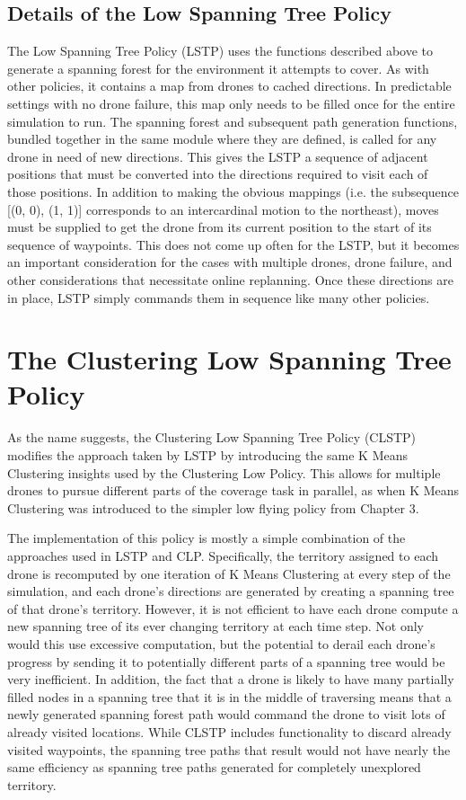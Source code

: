 \subsection{Details of the Low Spanning Tree Policy}

The Low Spanning Tree Policy (LSTP) uses the functions described above to generate a spanning forest for the environment it attempts to cover. As with other policies, it contains a map from drones to cached directions. In predictable settings with no drone failure, this map only needs to be filled once for the entire simulation to run. The spanning forest and subsequent path generation functions, bundled together in the same module where they are defined, is called for any drone in need of new directions. This gives the LSTP a sequence of adjacent positions that must be converted into the directions required to visit each of those positions. In addition to making the obvious mappings (i.e. the subsequence [(0, 0), (1, 1)] corresponds to an intercardinal motion to the northeast), moves must be supplied to get the drone from its current position to the start of its sequence of waypoints. This does not come up often for the LSTP, but it becomes an important consideration for the cases with multiple drones, drone failure, and other considerations that necessitate online replanning. Once these directions are in place, LSTP simply commands them in sequence like many other policies.

\section{The Clustering Low Spanning Tree Policy}

As the name suggests, the Clustering Low Spanning Tree Policy (CLSTP) modifies the approach taken by LSTP by introducing the same K Means Clustering insights used by the Clustering Low Policy. This allows for multiple drones to pursue different parts of the coverage task in parallel, as when K Means Clustering was introduced to the simpler low flying policy from Chapter 3.

The implementation of this policy is mostly a simple combination of the approaches used in LSTP and CLP. Specifically, the territory assigned to each drone is recomputed by one iteration of K Means Clustering at every step of the simulation, and each drone's directions are generated by creating a spanning tree of that drone's territory. However, it is not efficient to have each drone compute a new spanning tree of its ever changing territory at each time step. Not only would this use excessive computation, but the potential to derail each drone's progress by sending it to potentially different parts of a spanning tree would be very inefficient. In addition, the fact that a drone is likely to have many partially filled nodes in a spanning tree that it is in the middle of traversing means that a newly generated spanning forest path would command the drone to visit lots of already visited locations. While CLSTP includes functionality to discard already visited waypoints, the spanning tree paths that result would not have nearly the same efficiency as spanning tree paths generated for completely unexplored territory.

